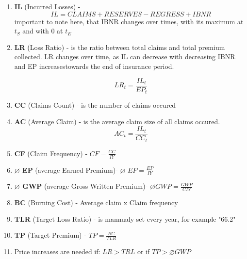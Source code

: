 \documentclass[11pt,a4paper,fleqn]{article}      %
\begin{document}
\begin{enumerate}








\item \textbf{IL} (Incurred Losses) - 
$$IL=CLAIMS + RESERVES - REGRESS + IBNR$$ important to note here, that IBNR changes over times, with its maximum at $t_{S}$ and with 0 at $t_{E}$

\item \textbf{LR} (Loss Ratio) -  is the ratio between total claims and total premium collected. LR changes over time, as IL can decrease with decreasing IBNR and EP increasestowards the end of insurance period. 

$$LR_t=\frac{IL_t}{EP_t}$$

\item \textbf{CC} (Claims Count) - is the number of claims occured

\item \textbf{AC} (Average Claim) - is the average claim size of all claims occured.
$$AC_t=\frac{IL_t}{CC_t}$$



\item \textbf{CF} (Claim Frequency) - $CF=\frac{CC}{IY}$

\item \textbf{$\varnothing$ EP} (average Earned Premium)- $\varnothing$ $EP =\frac{EP}{IY}$

\item \textbf{$\varnothing$ GWP} (average Gross Written Premium)- $\varnothing GWP =\frac{GWP}{CIY}$

\item \textbf{BC} (Burning Cost) - Average claim x Claim frequency

\item \textbf{TLR} (Target Loss Ratio) - is mannualy set every year, for example "66.2"

\item \textbf{TP} (Target Premium) - $TP=\frac{BC}{TLR}$

\item Price increases are needed if: $LR> TRL$ or if $TP>\varnothing GWP$



\end{enumerate}
\end{document}
